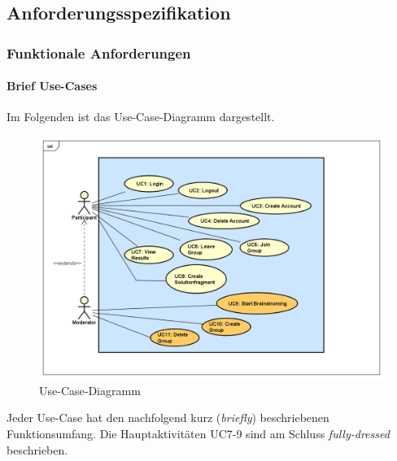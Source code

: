 \subsection{Anforderungsspezifikation}

\subsubsection{Funktionale Anforderungen}

\paragraph{Brief Use-Cases}

Im Folgenden ist das Use-Case-Diagramm dargestellt.
\begin{figure}[h]
	\centering
	\includegraphics[width=1\linewidth]{img/anforderungen/UC-Methode635}
	\caption{Use-Case-Diagramm}
	\label{fig:ucmethode-635}
\end{figure}

Jeder Use-Case hat den nachfolgend kurz (\textit{briefly}) beschriebenen  Funktionsumfang. Die Hauptaktivitäten UC7-9 sind am Schluss \textit{fully-dressed} beschrieben.

